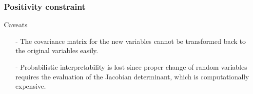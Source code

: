 \begin{frame}[t]
    \frametitle{Positivity constraint}
    Caveats
    \\
    \begin{itemize}
        \item[-] The covariance matrix for the new variables cannot be transformed back to the original variables easily.
        \item[-] Probabilistic interpretability is lost since proper change of random variables requires the evaluation of the Jacobian determinant, which is computationally expensive.
    \end{itemize}
\end{frame}